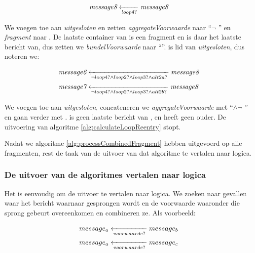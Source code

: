 \begin{align*}
	\transitionentry[\fragmessage{message8}]{\fragcond{loop4}}{\fragmessage{message8}}
\end{align*}

We voegen  toe aan \textit{uitgesloten} en zetten \textit{aggregateVoorwaarde} naar ``$\lnot$ '' en \textit{fragment} naar . De laatste container van  is een fragment en  is daar het laatste bericht van, dus zetten we \textit{bundelVoorwaarde} naar ``''.  is lid van \textit{uitgesloten}, dus noteren we:

\begin{align*}
	&\transitionentry[\fragmessage{message8}]{\lnot \fragcond{loop4} \land \fragcond{loop2} \land \fragcond{loop3} \land \fragcond{alt2a}}{\fragmessage{message6}} \\
	&\transitionentry[\fragmessage{message8}]{\lnot \fragcond{loop4} \land \fragcond{loop2} \land \fragcond{loop3} \land \fragcond{alt2b}}{\fragmessage{message7}}
\end{align*}

We voegen  toe aan \textit{uitgesloten}, concateneren we \textit{aggregateVoorwaarde} met ``$\land \lnot$ '' en gaan verder met .  is geen laatste bericht van , en  heeft geen ouder. De uitvoering van algoritme \ref{alg:calculateLoopReentry} stopt.

\parbreak

Nadat we algoritme \ref{alg:processCombinedFragment} hebben uitgevoerd op alle fragmenten, rest de taak van de uitvoer van dat algoritme te vertalen naar logica.

\subsubsection{De uitvoer van de algoritmes vertalen naar logica}

Het is eenvoudig om de uitvoer te vertalen naar logica. We zoeken naar gevallen waar het bericht waarnaar gesprongen wordt en de voorwaarde waaronder die sprong gebeurt overeenkomen en combineren ze. Als voorbeeld:

\begin{align*}
	&\transitionentry[\fragmessage{$message_b$}]{\fragcond{voorwaarde}}{\fragmessage{$message_a$}} \\
	&\transitionentry[\fragmessage{$message_c$}]{\fragcond{voorwaarde}}{\fragmessage{$message_a$}}
\end{align*}

